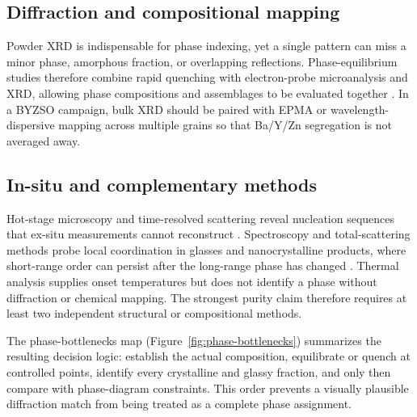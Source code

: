 \subsection{Diffraction and compositional mapping}

Powder XRD is indispensable for phase indexing, yet a single pattern can miss a minor phase, amorphous fraction, or overlapping reflections. Phase-equilibrium studies therefore combine rapid quenching with electron-probe microanalysis and XRD, allowing phase compositions and assemblages to be evaluated together \cite{kim2025key,derensy2026phase,abdeyazdan2024phase,abdeyazdan2023experimental}. In a BYZSO campaign, bulk XRD should be paired with EPMA or wavelength-dispersive mapping across multiple grains so that Ba/Y/Zn segregation is not averaged away.

\subsection{In-situ and complementary methods}

Hot-stage microscopy and time-resolved scattering reveal nucleation sequences that ex-situ measurements cannot reconstruct \cite{bocker2012in,mckenzie2020nucleation,mckenzie2021nucleation,aspillaga2023nucleation}. Spectroscopy and total-scattering methods probe local coordination in glasses and nanocrystalline products, where short-range order can persist after the long-range phase has changed \cite{mastelaro2018x,abdelhameed2023structural,shaaban2021spectroscopic,topper2023zinc}. Thermal analysis supplies onset temperatures but does not identify a phase without diffraction or chemical mapping. The strongest purity claim therefore requires at least two independent structural or compositional methods.

The phase-bottlenecks map (Figure~\ref{fig:phase-bottlenecks}) summarizes the
resulting decision logic: establish the actual composition, equilibrate or quench
at controlled points, identify every crystalline and glassy fraction, and only
then compare with phase-diagram constraints. This order prevents a visually
plausible diffraction match from being treated as a complete phase assignment.
